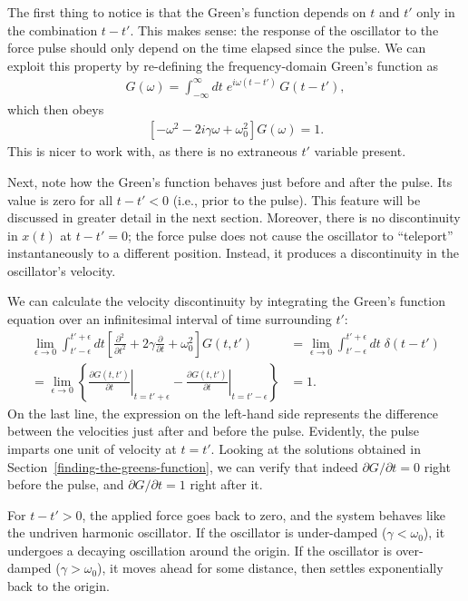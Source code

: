 \documentclass[10pt,a4paper]{article}
\begin{document}
The first thing to notice is that the Green's function depends on $t$
and $t'$ only in the combination $t-t'$. This makes sense: the
response of the oscillator to the force pulse should only depend on
the time elapsed since the pulse. We can exploit this property by
re-defining the frequency-domain Green's function as
\begin{align}
  G(\omega) = \int_{-\infty}^\infty dt \; e^{i\omega (t-t')}\, G(t-t'),
\end{align}
which then obeys
\begin{align}
  \left[- \omega^2 - 2i \gamma\omega + \omega_0^2\right] G(\omega) = 1.
\end{align}
This is nicer to work with, as there is no extraneous $t'$ variable
present.

Next, note how the Green's function behaves just before and after the
pulse. Its value is zero for all $t - t' < 0$ (i.e., prior to the
pulse). This feature will be discussed in greater detail in the next
section. Moreover, there is no discontinuity in $x(t)$ at $t - t' =
0$; the force pulse does not cause the oscillator to ``teleport''
instantaneously to a different position.  Instead, it produces a
discontinuity in the oscillator's velocity.

We can calculate the velocity discontinuity by integrating the Green's
function equation over an infinitesimal interval of time surrounding
$t'$:
\begin{align}
  \lim_{\epsilon \rightarrow 0} \int_{t'-\epsilon}^{t'+\epsilon} dt \left[\frac{\partial^2}{\partial t^2} + 2\gamma\frac{\partial}{\partial t} + \omega_0^2\right] G(t,t') &= \lim_{\epsilon \rightarrow 0} \int_{t'-\epsilon}^{t'+\epsilon} dt \; \delta(t-t') \\
  = \lim_{\epsilon \rightarrow 0} \left\{ \left.\frac{\partial G(t,t')}{\partial t}\right|_{t = t' +\epsilon} - \left.\frac{\partial G(t,t')}{\partial t}\right|_{t = t' - \epsilon}\right\} &= 1.
\end{align}
On the last line, the expression on the left-hand side represents the
difference between the velocities just after and before the
pulse. Evidently, the pulse imparts one unit of velocity at $t=t'$.
Looking at the solutions obtained in
Section~\ref{finding-the-greens-function}, we can verify that indeed
$\partial G/\partial t = 0$ right before the pulse, and $\partial
G/\partial t = 1$ right after it.

For $t - t' > 0$, the applied force goes back to zero, and the system
behaves like the undriven harmonic oscillator.  If the oscillator is
under-damped ($\gamma < \omega_0$), it undergoes a decaying
oscillation around the origin.  If the oscillator is over-damped
($\gamma > \omega_0$), it moves ahead for some distance, then settles
exponentially back to the origin.
\end{document}
